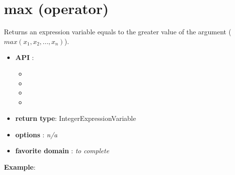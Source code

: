 
\section{max (operator)}\label{max:maxoperator}\hypertarget{max:maxoperator}{}
Returns an expression variable equals to the greater value of the argument (\(max(x_1, x_2, ..., x_n)\)).

\begin{itemize}
	\item \textbf{API} :
	\begin{itemize}
		\item {}
		\item {}
		\item {}
		\item {}
	\end{itemize}
	\item \textbf{return type}: IntegerExpressionVariable
	\item \textbf{options} : \emph{n/a}
	\item \textbf{favorite domain} : \emph{to complete}
\end{itemize}

\textbf{Example}:


